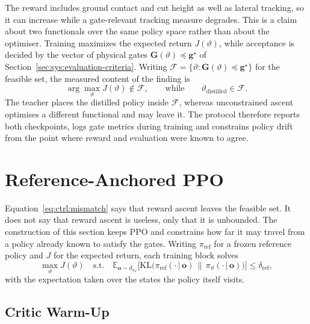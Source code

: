 The reward includes ground contact and cut height as well as lateral tracking,
so it can increase while a gate-relevant tracking measure degrades. This is a
claim about two functionals over the same policy space rather than about the
optimiser. Training maximizes the expected return
$J(\vartheta)$, while acceptance is decided by the vector of physical gates
$\bm{G}(\vartheta) \preceq \bm{g}^{\star}$ of
Section~\ref{sec:sys:evaluation-criteria}. Writing
$\mathcal{F} = \{\vartheta : \bm{G}(\vartheta) \preceq \bm{g}^{\star}\}$ for the
feasible set, the measured content of the finding is
%
\begin{equation}
  \label{eq:ctrl:mismatch}
  \arg\max_{\vartheta} J(\vartheta) \notin \mathcal{F},
  \qquad\text{while}\qquad
  \vartheta_{\mathrm{distilled}} \in \mathcal{F}.
\end{equation}
%
The teacher places the distilled policy inside $\mathcal{F}$, whereas
unconstrained ascent optimises a different functional and may leave it. The
protocol therefore reports both checkpoints, logs gate metrics during training
and constrains policy drift from the point where reward and evaluation were
known to agree.

\section{Reference-Anchored PPO}
\label{sec:ctrl:anchored}

Equation~\eqref{eq:ctrl:mismatch} says that reward ascent leaves the feasible
set. It does not say that reward ascent is useless, only that it is unbounded.
The construction of this section keeps PPO and constrains how far it may travel
from a policy already known to satisfy the gates. Writing $\pi_{\mathrm{ref}}$
for a frozen reference policy and $J$ for the expected return, each training
block solves
%
\begin{equation}
  \label{eq:ctrl:constrained}
  \max_{\vartheta} J(\vartheta)
  \quad \text{s.t.} \quad
  \mathbb{E}_{\bm{o}\sim d_{\pi_\vartheta}}
  \bigl[ \mathrm{KL}\bigl( \pi_{\mathrm{ref}}(\cdot\,|\,\bm{o})
  \,\|\, \pi_\vartheta(\cdot\,|\,\bm{o}) \bigr) \bigr]
  \le \delta_{\mathrm{ref}},
\end{equation}
%
with the expectation taken over the states the policy itself visits.

\subsection{Critic Warm-Up}

